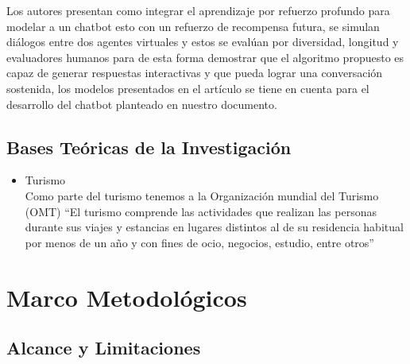 \documentclass[12pt,a4paper,oneside]{article}
\begin{document}
  Los autores presentan como integrar el aprendizaje por refuerzo profundo para modelar a un chatbot esto con un refuerzo de recompensa futura, se simulan diálogos entre dos agentes virtuales y estos se evalúan por diversidad, longitud y evaluadores humanos para de esta forma demostrar que el algoritmo propuesto es capaz de generar respuestas interactivas y que pueda lograr una conversación sostenida, los modelos presentados en el artículo se tiene en cuenta para el desarrollo del chatbot planteado en nuestro documento.

\subsection{Bases Teóricas de la Investigación}
\begin{itemize}
  \item Turismo\\
  Como parte del turismo tenemos a la Organización mundial del Turismo
(OMT) “El turismo comprende las actividades que realizan las personas
durante sus viajes y estancias en lugares distintos al de su residencia
habitual por menos de un año y con fines de ocio, negocios, estudio, entre
otros”
\end{itemize}
\section{Marco Metodológicos}
\subsection{Alcance y Limitaciones}
\end{document}
